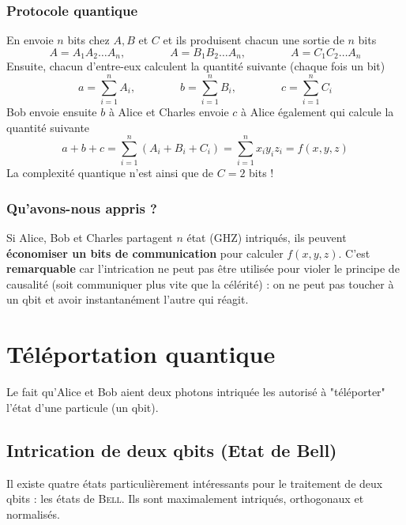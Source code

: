 \subsubsection{Protocole quantique}
En envoie $n$ bits chez $A,B$ et $C$ et ils produisent chacun une sortie de $n$ bits
\begin{equation}
A = A_1A_2\dots A_n,\qquad\qquad
A = B_1B_2\dots A_n,\qquad\qquad
A = C_1C_2\dots A_n
\end{equation}
Ensuite, chacun d'entre-eux calculent la quantité suivante (chaque fois un bit)
\begin{equation}
a = \sum_{i=1}^n A_i,\qquad\qquad
b = \sum_{i=1}^n B_i,\qquad\qquad
c = \sum_{i=1}^n C_i
\end{equation}
Bob envoie ensuite $b$ à Alice et Charles envoie $c$ à Alice également qui calcule 
la quantité suivante
\begin{equation}
a+b+c = \sum_{i=1}^n (A_i+B_i+C_i) = \sum_{i=1}^n x_iy_iz_i = f(x,y,z)
\end{equation}
La complexité quantique n'est ainsi que de $C=2$ bits !

\subsubsection{Qu'avons-nous appris ?}
Si Alice, Bob et Charles partagent $n$ état (GHZ) intriqués, ils peuvent \textbf{économiser
un bits de communication} pour calculer $f(x,y,z)$. C'est \textbf{remarquable} car l'intrication
ne peut pas être utilisée pour violer le principe de causalité (soit communiquer plus vite que
la célérité) : on ne peut pas toucher à un qbit et avoir instantanément l'autre qui réagit.


\section{Téléportation quantique}
Le fait qu'Alice et Bob aient deux photons intriquée les autorisé à "téléporter" l'état d'une
particule (un qbit).

\subsection{Intrication de deux qbits (Etat de Bell)}
Il existe quatre états particulièrement intéressants pour le traitement de deux qbits : les
états de \textsc{Bell}. Ils sont maximalement intriqués, orthogonaux et normalisés.\\

\ 

